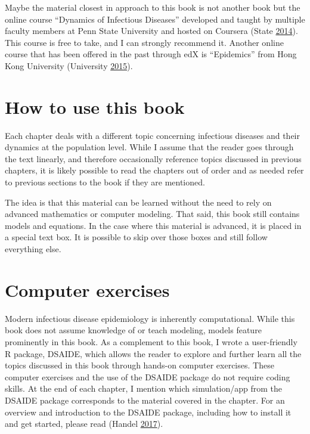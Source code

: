 \documentclass[
]{book}
\begin{document}
Maybe the material closest in approach to this book is not another book but the online course ``Dynamics of Infectious Diseases'' developed and taught by multiple faculty members at Penn State University and hosted on Coursera (State \protect\hyperlink{ref-epimooc}{2014}). This course is free to take, and I can strongly recommend it. Another online course that has been offered in the past through edX is ``Epidemics'' from Hong Kong University (University \protect\hyperlink{ref-hkepidemics}{2015}).

\hypertarget{how-to-use-this-book}{%
\section{How to use this book}\label{how-to-use-this-book}}

Each chapter deals with a different topic concerning infectious diseases and their dynamics at the population level. While I assume that the reader goes through the text linearly, and therefore occasionally reference topics discussed in previous chapters, it is likely possible to read the chapters out of order and as needed refer to previous sections to the book if they are mentioned.

The idea is that this material can be learned without the need to rely on advanced mathematics or computer modeling. That said, this book still contains models and equations. In the case where this material is advanced, it is placed in a special text box. It is possible to skip over those boxes and still follow everything else.

\hypertarget{computer-exercises}{%
\section{Computer exercises}\label{computer-exercises}}

Modern infectious disease epidemiology is inherently computational. While this book does not assume knowledge of or teach modeling, models feature prominently in this book. As a complement to this book, I wrote a user-friendly R package, DSAIDE, which allows the reader to explore and further learn all the topics discussed in this book through hands-on computer exercises. These computer exercises and the use of the DSAIDE package do not require coding skills. At the end of each chapter, I mention which simulation/app from the DSAIDE package corresponds to the material covered in the chapter. For an overview and introduction to the DSAIDE package, including how to install it and get started, please read (Handel \protect\hyperlink{ref-handel17}{2017}).
\end{document}
